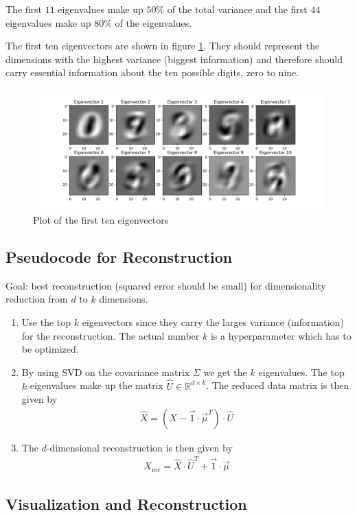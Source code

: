 \documentclass[12pt]{article}
\begin{document}
The first $11$ eigenvalues make up $50\%$ of the total variance and the first $44$ eigenvalues make up $80\%$ of the eigenvalues. \par 
The first ten eigenvectors are shown in figure \ref{fig:4.2.4}. They should represent the dimensions with the highest variance (biggest information) and therefore should carry essential information about the ten possible digits, zero to nine.

\begin{figure}
	\centering
	\includegraphics[width=0.66\linewidth]{../Problem_4/Problem_4.2.4.png}
	\caption{Plot of the first ten eigenvectors}
	\label{fig:4.2.4}
\end{figure}

\subsection{Pseudocode for Reconstruction}

Goal: best reconstruction (squared error should be small) for dimensionality reduction from $d$ to $k$ dimensions.
\begin{enumerate}
	\item Use the top $k$ eigenvectors since they carry the larges variance (information) for the reconstruction. The actual number $k$ is a hyperparameter which has to be optimized.
	\item By using SVD on the covariance matrix $\Sigma$ we get the $k$ eigenvalues. The top $k$ eigenvalues make up the matrix $\hat{U}\in \mathbb{R}^{d \times k}$. The reduced data matrix is then given by
	\begin{align}
	\hat{X} = \left( X - \vec{1}\cdot \vec{\mu}^T \right)\cdot \hat{U} 
	\end{align}
	\item The $d$-dimensional reconstruction is then given by
	\begin{align}
	X_\text{rec} = \hat{X}\cdot \hat{U}^T + \vec{1}\cdot\vec{\mu}
	\end{align}
\end{enumerate}

\subsection{Visualization and Reconstruction}
\end{document}
